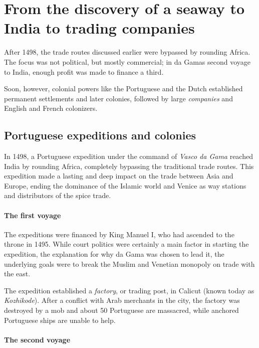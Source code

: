 \documentclass[11pt, a4paper, headings=standardclasses]{scrartcl}
\begin{document}
\section{From the discovery of a seaway to India to trading companies}

After 1498, the trade routes discussed earlier were bypassed by rounding Africa. The focus was not political, but mostly commercial; in da Gamas second voyage to India, enough profit was made to finance a third.\autocite[Section \textit{The second voyage}]{Vasco}

Soon, however, colonial powers like the Portuguese and the Dutch established permanent settlements and later colonies, followed by large \emph{companies} and English and French colonizers.

\subsection{Portuguese expeditions and colonies}

In 1498, a Portuguese expedition under the command of \emph{Vasco da Gama} reached India by rounding Africa, completely bypassing the traditional trade routes\autocite{VdG}. This expedition made a lasting and deep impact on the trade between Asia and Europe, ending the dominance of the Islamic world and Venice as way stations and distributors of the spice trade.\autocite{GLO}

\paragraph{The first voyage}

The expeditions were financed by King Manuel I, who had ascended to the throne in 1495. While court politics were certainly a main factor in starting the expedition, the explanation for why da Gama was chosen to lead it, the underlying goals were to break the Muslim and Venetian monopoly on trade with the east.\autocite{Vasco}

The expedition established a \emph{factory}, or trading post, in Calicut (known today as \textit{Kozhikode}). After a conflict with Arab merchants in the city, the factory was destroyed by a mob and about 50 Portuguese are massacred, while anchored Portuguese ships are unable to help.\autocite[Paragraph 6]{kol}

\paragraph{The second voyage}
\end{document}
